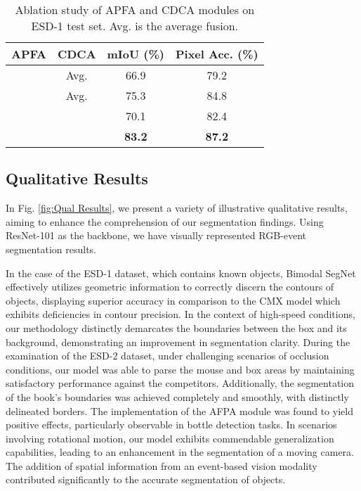 \documentclass[lettersize,journal]{IEEEtran}
\begin{document}
\begin{table}[ht]
\centering
\caption{Ablation study of APFA and CDCA modules on ESD-1 test set. Avg. is the average fusion.}
\begin{tabular}{|c|c|c|c|}
\hline
\textbf{APFA} & \textbf{CDCA} & \textbf{mIoU (\%)} & \textbf{Pixel Acc. (\%)} \\
\hline
 & Avg. &  66.9  & 79.2 \\
\hline
 & Avg. & 75.3  & 84.8  \\
\hline
 &  & 70.1  & 82.4  \\
\hline
 &  & \textbf{83.2}  & \textbf{87.2}  \\
\hline
\end{tabular}
\label{tab:ablation_study}
\end{table}








\subsection{Qualitative Results}

In Fig. \ref{fig:Qual Results}, we present a variety of illustrative qualitative results, aiming to enhance the comprehension of our segmentation findings. Using ResNet-101 as the backbone, we have visually represented RGB-event segmentation results.

In the case of the ESD-1 dataset, which contains known objects, Bimodal SegNet effectively utilizes geometric information to correctly discern the contours of objects, displaying superior accuracy in comparison to the CMX model which exhibits deficiencies in contour precision. In the context of high-speed conditions, our methodology distinctly demarcates the boundaries between the box and its background, demonstrating an improvement in segmentation clarity. During the examination of the ESD-2 dataset, under challenging scenarios of occlusion conditions, our model was able to parse the mouse and box areas by maintaining satisfactory performance against the competitors. Additionally, the segmentation of the book's boundaries was achieved completely and smoothly, with distinctly delineated borders. The implementation of the AFPA module was found to yield positive effects, particularly observable in bottle detection tasks. In scenarios involving rotational motion, our model exhibits commendable generalization capabilities, leading to an enhancement in the segmentation of a moving camera. The addition of spatial information from an event-based vision modality contributed significantly to the accurate segmentation of objects. 
\end{document}
